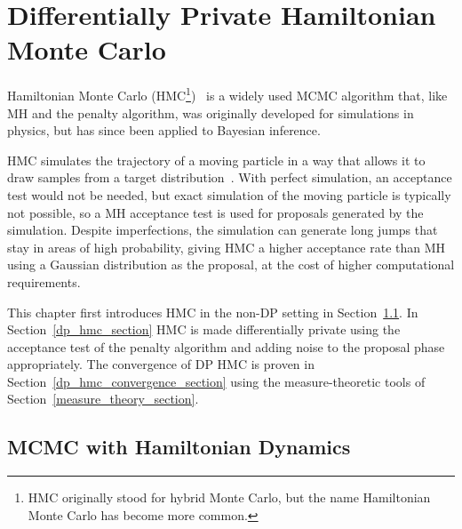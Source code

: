 \documentclass[english,twoside,openright]{HYgraduMLDS}
\begin{document}
\chapter{Differentially Private Hamiltonian Monte Carlo}\label{hmc_chapter}

Hamiltonian Monte Carlo (HMC\footnote{
    HMC originally stood for hybrid Monte Carlo, 
    but the name Hamiltonian Monte Carlo has become more common.
})~\cite{DKP87, neal2012mcmc} is a widely used MCMC algorithm that, like
MH and the penalty algorithm, was originally developed
for simulations in physics, but has since been applied to
Bayesian inference. 

HMC simulates the trajectory of a moving particle in a way 
that allows it to draw samples from a target distribution~\cite{neal2012mcmc}. 
With perfect simulation,
an acceptance test would not be needed, but exact simulation of the moving particle 
is typically not possible, so a MH acceptance test is used
for proposals generated by the simulation. Despite imperfections, the simulation can generate long jumps
that stay in areas of high probability, giving HMC a higher acceptance rate 
than MH using a Gaussian distribution as the proposal, at the
cost of higher computational requirements.

This chapter first introduces HMC in the non-DP setting in Section~\ref{hmc_basics_section}.
In Section~\ref{dp_hmc_section} HMC is made differentially private using the
acceptance test of the penalty algorithm and adding noise to the proposal phase 
appropriately. The convergence of DP HMC is proven in
Section~\ref{dp_hmc_convergence_section} using the measure-theoretic tools of
Section~\ref{measure_theory_section}.

\section{MCMC with Hamiltonian Dynamics}\label{hmc_basics_section}
\end{document}

